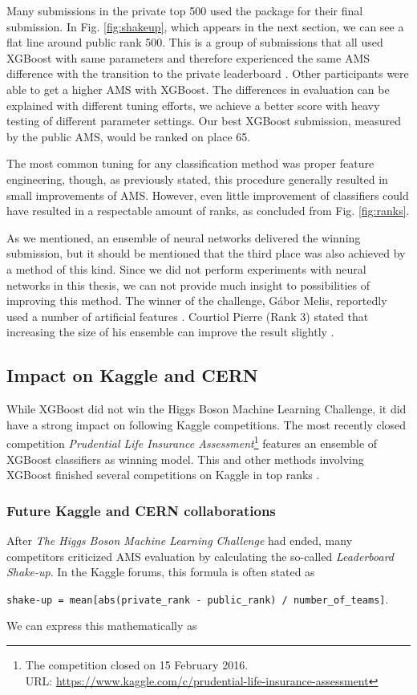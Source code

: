 Many submissions in the private top 500 used the package for their final submission. In Fig. \ref{fig:shakeup}, which appears in the next section, we can see a flat line around public rank 500. This is a group of submissions that all used XGBoost with same parameters and therefore experienced the same AMS difference with the transition to the private leaderboard \cite{hebert}.
Other participants were able to get a higher AMS with XGBoost. The differences in evaluation can be explained with different tuning efforts, we achieve a better score with heavy testing of different parameter settings. Our best XGBoost submission, measured by the public AMS, would be ranked on place 65.

The most common tuning for any classification method was proper feature engineering, though, as previously stated, this procedure generally resulted in small improvements of AMS. However, even little improvement of classifiers could have resulted in a respectable amount of ranks, as concluded from Fig. \ref{fig:ranks}.

As we mentioned, an ensemble of neural networks delivered the winning submission, but it should be mentioned that the third place was also achieved by a method of this kind.
Since we did not perform experiments with neural networks in this thesis, we can not provide much insight to possibilities of improving this method. The winner of the challenge, Gábor Melis, reportedly used a number of artificial features \cite{meli14}. Courtiol Pierre (Rank 3) stated that increasing the size of his ensemble can improve the result slightly \cite{courtiol-3rd}.

\subsection{Impact on Kaggle and CERN}
While XGBoost did not win the Higgs Boson Machine Learning Challenge, it did have a strong impact on following Kaggle competitions. The most recently closed competition \emph{Prudential Life Insurance Assessment}\footnote{The competition closed on 15 February 2016.\\ URL: \url{https://www.kaggle.com/c/prudential-life-insurance-assessment}} features an ensemble of XGBoost classifiers as winning model. This and other methods involving XGBoost finished several competitions on Kaggle in top ranks \cite{xgbdoc}.

\subsubsection{Future Kaggle and CERN collaborations}
After \emph{The Higgs Boson Machine Learning Challenge} had ended, many competitors criticized AMS evaluation by calculating the so-called \emph{Leaderboard Shake-up}. In the Kaggle forums, this formula is often stated as
\begin{center}
\texttt{shake-up = mean[abs(private\_rank - public\_rank) / number\_of\_teams]}.
\end{center}
We can express this mathematically as


